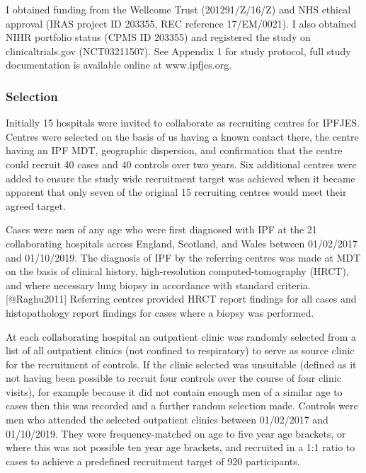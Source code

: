 I obtained funding from the Wellcome Trust (201291/Z/16/Z) and NHS
ethical approval (IRAS project ID 203355, REC reference 17/EM/0021). I
also obtained NIHR portfolio status (CPMS ID 203355) and registered the
study on clinicaltrials.gov (NCT03211507). See Appendix 1 for study
protocol, full study documentation is available online at
www.ipfjes.org.

\hypertarget{selection}{%
\subsubsection{Selection}\label{selection}}

Initially 15 hospitals were invited to collaborate as recruiting centres
for IPFJES. Centres were selected on the basis of us having a known
contact there, the centre having an IPF MDT, geographic dispersion, and
confirmation that the centre could recruit 40 cases and 40 controls over
two years. Six additional centres were added to ensure the study wide
recruitment target was achieved when it became apparent that only seven
of the original 15 recruiting centres would meet their agreed target.

Cases were men of any age who were first diagnosed with IPF at the 21
collaborating hospitals across England, Scotland, and Wales between
01/02/2017 and 01/10/2019. The diagnosis of IPF by the referring centres
was made at MDT on the basis of clinical history, high-resolution
computed-tomography (HRCT), and where necessary lung biopsy in
accordance with standard criteria.{[}@Raghu2011{]} Referring centres
provided HRCT report findings for all cases and histopathology report
findings for cases where a biopsy was performed.

At each collaborating hospital an outpatient clinic was randomly
selected from a list of all outpatient clinics (not confined to
respiratory) to serve as source clinic for the recruitment of controls.
If the clinic selected was unsuitable (defined as it not having been
possible to recruit four controls over the course of four clinic
visits), for example because it did not contain enough men of a similar
age to cases then this was recorded and a further random selection made.
Controls were men who attended the selected outpatient clinics between
01/02/2017 and 01/10/2019. They were frequency-matched on age to five
year age brackets, or where this was not possible ten year age brackets,
and recruited in a 1:1 ratio to cases to achieve a predefined
recruitment target of 920 participants.

